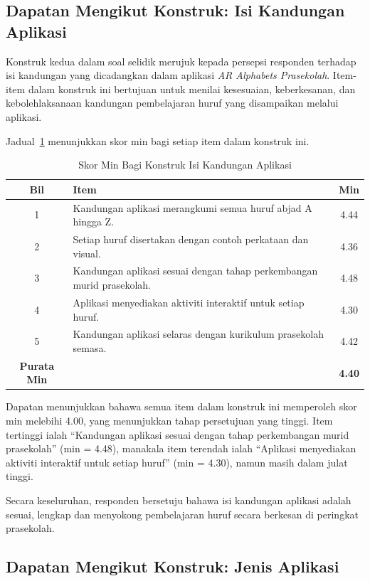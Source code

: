 {\subsection{Dapatan Mengikut Konstruk: Isi Kandungan Aplikasi}

Konstruk kedua dalam soal selidik merujuk kepada persepsi responden terhadap isi kandungan yang dicadangkan dalam aplikasi \textit{AR Alphabets Prasekolah}. Item-item dalam konstruk ini bertujuan untuk menilai kesesuaian, keberkesanan, dan kebolehlaksanaan kandungan pembelajaran huruf yang disampaikan melalui aplikasi.

Jadual~\ref{jadual:isiKandungan} menunjukkan skor min bagi setiap item dalam konstruk ini.

\begin{table}[H]
\centering
\caption{Skor Min Bagi Konstruk Isi Kandungan Aplikasi}
\label{jadual:isiKandungan}
\begin{tabular}{|c|p{9cm}|c|}
\hline
\textbf{Bil} & \textbf{Item} & \textbf{Min} \\
\hline
1 & Kandungan aplikasi merangkumi semua huruf abjad A hingga Z. & 4.44 \\
\hline
2 & Setiap huruf disertakan dengan contoh perkataan dan visual. & 4.36 \\
\hline
3 & Kandungan aplikasi sesuai dengan tahap perkembangan murid prasekolah. & 4.48 \\
\hline
4 & Aplikasi menyediakan aktiviti interaktif untuk setiap huruf. & 4.30 \\
\hline
5 & Kandungan aplikasi selaras dengan kurikulum prasekolah semasa. & 4.42 \\
\hline
\textbf{Purata Min} & & \textbf{4.40} \\
\hline
\end{tabular}
\end{table}

Dapatan menunjukkan bahawa semua item dalam konstruk ini memperoleh skor min melebihi 4.00, yang menunjukkan tahap persetujuan yang tinggi. Item tertinggi ialah “Kandungan aplikasi sesuai dengan tahap perkembangan murid prasekolah” (min = 4.48), manakala item terendah ialah “Aplikasi menyediakan aktiviti interaktif untuk setiap huruf” (min = 4.30), namun masih dalam julat tinggi.

Secara keseluruhan, responden bersetuju bahawa isi kandungan aplikasi adalah sesuai, lengkap dan menyokong pembelajaran huruf secara berkesan di peringkat prasekolah.
\subsection{Dapatan Mengikut Konstruk: Jenis Aplikasi}

}

